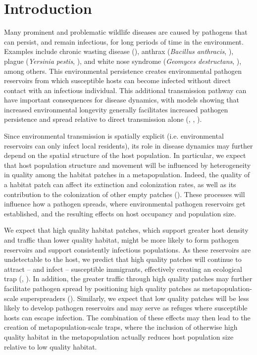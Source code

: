\documentclass{article}
\begin{document}
\section{Introduction}
\label{intro}

Many prominent and problematic wildlife diseases are caused by pathogens that can persist, and remain infectious, for long periods of time in the environment.  Examples include chronic wasting disease (\cite{Miller2006}), anthrax (\emph{Bacillus anthracis}, \cite{Dragon1995}), plague (\emph{Yersinia pestis}, \cite{Eisen2008}), and white nose syndrome (\emph{Geomyces destructans}, \cite{Lindner2011}), among others.  This environmental persistence creates environmental pathogen reservoirs from which susceptible hosts can become infected without direct contact with an infectious individual.  This additional transmission pathway can have important consequences for disease dynamics, with models showing that increased environmental longevity generally facilitates increased pathogen persistence and spread relative to direct transmission alone (\cite{Almberg2011}, \cite{Sharp2011}, \cite{Breban2009}). 

Since environmental transmission is spatially explicit (i.e. environmental reservoirs can only infect local residents), its role in disease dynamics may further depend on the spatial structure of the host population.  In particular, we expect that host population structure and movement will be influenced by heterogeneity in quality among the habitat patches in a metapopulation.  Indeed, the quality of a habitat patch can affect its extinction and colonization rates, as well as its contribution to the colonization of other empty patches (\cite{Moilanen1998}).  These processes will influence how a pathogen spreads, where environmental pathogen reservoirs get established, and the resulting effects on host occupancy and population size.  

We expect that high quality habitat patches, which support greater host density and traffic than lower quality habitat, might be more likely to form pathogen reservoirs and support consistently infectious populations.  As these reservoirs are undetectable to the host, we predict that high quality patches will continue to attract -- and infect -- susceptible immigrants, effectively creating an ecological trap (\cite{Robertson2006}, \cite{Almberg2011}).  In addition, the greater traffic through high quality patches may further facilitate pathogen spread by positioning high quality patches as metapopulation-scale superspreaders (\cite{Paull2012}).  Similarly, we expect that low quality patches will be less likely to develop pathogen reservoirs and may serve as refuges where susceptible hosts can escape infection.
The combination of these effects may then lead to the creation of metapopulation-scale traps, where the inclusion of otherwise high quality habitat in the metapopulation actually reduces host population size relative to low quality habitat.
\end{document}
